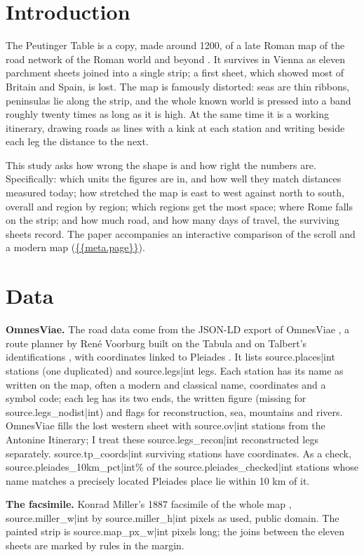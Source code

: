 \documentclass[11pt,a4paper]{article}
\begin{document}
\section{Introduction}
The Peutinger Table is a copy, made around 1200, of a late Roman map of the road network of the Roman world and beyond \citep{talbert}. It survives in Vienna as eleven parchment sheets joined into a single strip; a first sheet, which showed most of Britain and Spain, is lost. The map is famously distorted: seas are thin ribbons, peninsulas lie along the strip, and the whole known world is pressed into a band roughly twenty times as long as it is high. At the same time it is a working itinerary, drawing roads as lines with a kink at each station and writing beside each leg the distance to the next.

This study asks how wrong the shape is and how right the numbers are. Specifically: which units the figures are in, and how well they match distances measured today; how stretched the map is east to west against north to south, overall and region by region; which regions get the most space; where Rome falls on the strip; and how much road, and how many days of travel, the surviving sheets record. The paper accompanies an interactive comparison of the scroll and a modern map (\url{{{meta.page}}}).

\section{Data}
\textbf{OmnesViae.} The road data come from the JSON-LD export of OmnesViae \citep{omnesviae}, a route planner by Ren\'e Voorburg built on the Tabula and on Talbert's identifications \citep{talbert}, with coordinates linked to Pleiades \citep{pleiades}. It lists {{source.places|int}} stations (one duplicated) and {{source.legs|int}} legs. Each station has its name as written on the map, often a modern and classical name, coordinates and a symbol code; each leg has its two ends, the written figure (missing for {{source.legs_nodist|int}}) and flags for reconstruction, sea, mountains and rivers. OmnesViae fills the lost western sheet with {{source.ov|int}} stations from the Antonine Itinerary; I treat these {{source.legs_recon|int}} reconstructed legs separately. {{source.tp_coords|int}} surviving stations have coordinates. As a check, {{source.pleiades_10km_pct|int}}\% of the {{source.pleiades_checked|int}} stations whose name matches a precisely located Pleiades place lie within 10 km of it.

\textbf{The facsimile.} Konrad Miller's 1887 facsimile of the whole map \citep{miller}, {{source.miller_w|int}} by {{source.miller_h|int}} pixels as used, public domain. The painted strip is {{source.map_px_w|int}} pixels long; the joins between the eleven sheets are marked by rules in the margin.
\end{document}
